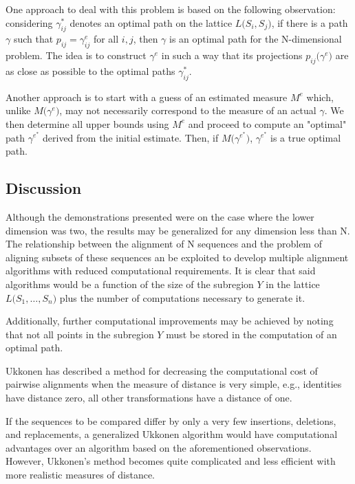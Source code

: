 \documentclass[11pt]{article}
\begin{document}
One approach to deal with this problem is based on the following observation: considering $\gamma^*_{ij}$ denotes an optimal path on the lattice $L\big(S_i, S_j\big)$, if there is a path $\gamma$ such that $p_{ij} = \gamma^e_{ij}$ for all $i,j$, then $\gamma$ is an optimal path for the N-dimensional problem. The idea is to construct $\gamma^e$ in such a way that its projections $p_{ij}\big(\gamma^e\big)$ are as close as possible to the optimal paths $\gamma^*_{ij}$.

Another approach is to start with a guess of an estimated measure $M^e$ which, unlike $M\big(\gamma^e\big)$, may not necessarily correspond to the measure of an actual $\gamma$. We then determine all upper bounds using $M^e$ and proceed to compute an "optimal" path $\gamma^{e^*}$ derived from the initial estimate. Then, if $M\big(\gamma^{e^*}\big)$, $\gamma^{e^*}$ is a true optimal path.

\subsection{Discussion}

Although the demonstrations presented were on the case where the lower dimension was two, the results may be generalized for any dimension less than N. The relationship between the alignment of N sequences and the problem of aligning subsets of these sequences an be exploited to develop multiple alignment algorithms with reduced computational requirements. It is clear that said algorithms would be a function of the size of the subregion $Y$ in the lattice $L\big(S_1, \dots, S_n\big)$ plus the number of computations necessary to generate it.

Additionally, further computational improvements may be achieved by noting that not all points in the subregion $Y$ must be stored in the computation of an optimal path.

Ukkonen has described a method for decreasing the computational cost of pairwise alignments when the measure of distance is very simple, e.g., identities have distance zero, all other transformations have a distance of one.

If the sequences to be compared differ by only a very few insertions, deletions, and replacements, a generalized Ukkonen algorithm would have computational advantages over an algorithm based on the aforementioned observations. However, Ukkonen's method becomes quite complicated and less efficient with more realistic measures of distance.
\end{document}
